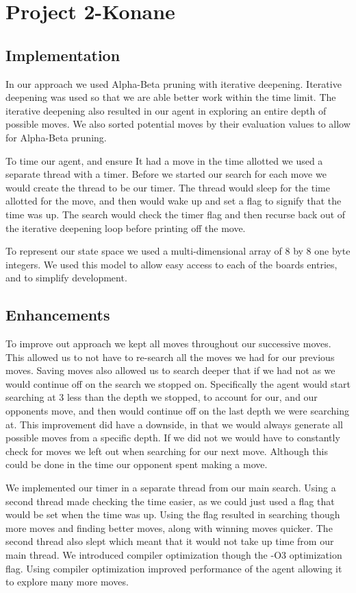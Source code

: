 \documentclass[12pt]{article}
\begin{document}
\section*{Project 2-Konane}

\subsection*{Implementation}
In our approach we used Alpha-Beta pruning with iterative deepening.
Iterative deepening was used so that we are able better work within the time limit.
The iterative deepening also resulted in our agent in exploring an entire depth of possible moves.
We also sorted potential moves by their evaluation values to allow for Alpha-Beta pruning.

To time our agent, and ensure It had a move in the time allotted we used a separate thread with a timer.
Before we started our search for each move we would create the thread to be our timer.
The thread would sleep for the time allotted for the move, and then would wake up and set a flag to signify that the time was up.
The search would check the timer flag and then recurse back out of the iterative deepening loop before printing off the move.

To represent our state space we used a multi-dimensional array of 8 by 8 one byte integers.
We used this model to allow easy access to each of the boards entries, and to simplify development.

\subsection*{Enhancements}
To improve out approach we kept all moves throughout our successive moves.
This allowed us to not have to re-search all the moves we had for our previous moves.
Saving moves also allowed us to search deeper that if we had not as we would continue off on the search we stopped on.
Specifically the agent would start searching at 3 less than the depth we stopped, to account for our, and our opponents move, and then would continue off on the last depth we were searching at.
This improvement did have a downside, in that we would always generate all possible moves from a specific depth.
If we did not we would have to constantly check for moves we left out when searching for our next move.
Although this could be done in the time our opponent spent making a move.

We implemented our timer in a separate thread from our main search.
Using a second thread made checking the time easier, as we could just used a flag that would be set when the time was up.
Using the flag resulted in searching though more moves and finding better moves, along with winning moves quicker.
The second thread also slept which meant that it would not take up time from our main thread.
We introduced compiler optimization though the -O3 optimization flag.
Using compiler optimization improved performance of the agent allowing it to explore many more moves.
\end{document}
